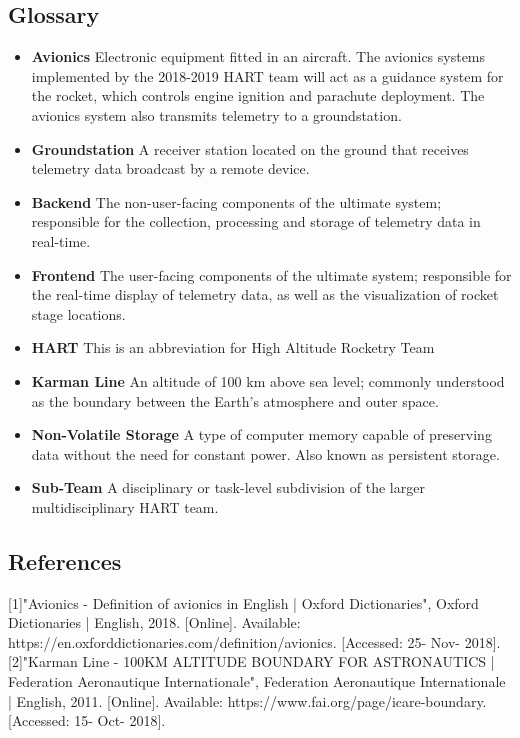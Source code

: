 \documentclass[onecolumn, draftclsnofoot,10pt, compsoc]{IEEEtran}
\begin{document}
		\subsection{Glossary}
			\begin{itemize}
				\item \textbf{Avionics}
					Electronic equipment fitted in an aircraft.
					The avionics systems implemented by the 2018-2019 HART team will act as a guidance system for the rocket, which controls engine ignition and parachute deployment.
					The avionics system also transmits telemetry to a groundstation.
				\item \textbf{Groundstation}
					A receiver station located on the ground that receives telemetry data broadcast by a remote device.
				\item \textbf{Backend}
					The non-user-facing components of the ultimate system; responsible for the collection, processing and storage of telemetry data in real-time.
				\item \textbf{Frontend}
					The user-facing components of the ultimate system; responsible for the real-time display of telemetry data, as well as the visualization of rocket stage locations.
				\item \textbf{HART}
					This is an abbreviation for High Altitude Rocketry Team
				\item \textbf{Karman Line}
					An altitude of 100 km above sea level; commonly understood as the boundary between the Earth's atmosphere and outer space.
				\item \textbf{Non-Volatile Storage}
					A type of computer memory capable of preserving data without the need for constant power. Also known as persistent storage.
				\item \textbf{Sub-Team}
					A disciplinary or task-level subdivision of the larger multidisciplinary HART team.

			\end{itemize}

		\subsection{References}
			
			[1]"Avionics - Definition of avionics in English | Oxford Dictionaries", Oxford Dictionaries | English, 2018. [Online]. Available: https://en.oxforddictionaries.com/definition/avionics. [Accessed: 25- Nov- 2018].\\
			
			[2]"Karman Line - 100KM ALTITUDE BOUNDARY FOR ASTRONAUTICS | Federation Aeronautique Internationale", Federation Aeronautique Internationale | English, 2011. [Online]. Available: https://www.fai.org/page/icare-boundary. [Accessed: 15- Oct- 2018].\\
			
\end{document}
